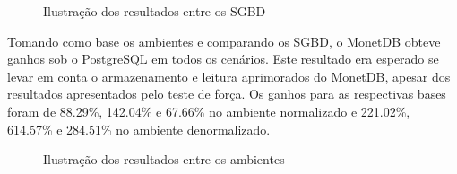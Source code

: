 \documentclass[12pt]{article}
\begin{document}
\begin{figure}[htpb]
    \centering
    \caption{Ilustração dos resultados entre os SGBD}\label{fig:qph_sgbd}
\end{figure}

Tomando como base os ambientes e comparando os SGBD, o MonetDB obteve ganhos sob o PostgreSQL 
em todos os cenários. Este resultado era esperado se levar em conta o armazenamento 
e leitura aprimorados do MonetDB, apesar dos resultados apresentados pelo teste de força. 
Os ganhos para as respectivas bases foram de 88.29\%, 142.04\% e 67.66\% no ambiente 
normalizado e 221.02\%, 614.57\% e 284.51\% no ambiente denormalizado.

\begin{figure}[htpb]
    \centering
    \caption{Ilustração dos resultados entre os ambientes}\label{fig:qph_ambiente}
\end{figure}
\end{document}
